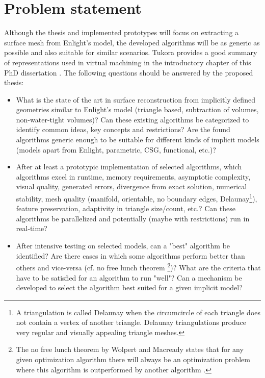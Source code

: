 
\section{Problem statement}

Although the thesis and implemented prototypes will focus on extracting a surface mesh from Enlight's model, the developed algorithms will be as generic as possible and also suitable for similar scenarios. Tukora provides a good summary of representations used in virtual machining in the introductory chapter of this PhD dissertation \cite{virtual_machining_review}.
The following questions should be answered by the proposed thesis:

\begin{itemize}
	\item What is the state of the art in surface reconstruction from implicitly defined geometries similar to Enlight's model (triangle based, subtraction of volumes, non-water-tight volumes)? Can these existing algorithms be categorized to identify common ideas, key concepts and restrictions? Are the found algorithms generic enough to be suitable for different kinds of implicit models (models apart from Enlight, parametric, CSG, functional, etc.)?
	
	\item After at least a prototypic implementation of selected algorithms, which algorithms excel in runtime, memory requirements, asymptotic complexity, visual quality, generated errors, divergence from exact solution, numerical stability, mesh quality (manifold, orientable, no boundary edges, Delaunay\footnote{A triangulation is called Delaunay when the circumcircle of each triangle does not contain a vertex of another triangle. Delaunay triangulations produce very regular and visually appealing triangle meshes.}), feature preservation, adaptivity in triangle size/count, etc.? Can these algorithms be parallelized and potentially (maybe with restrictions) run in real-time?
	
	\item After intensive testing on selected models, can a "best" algorithm be identified? Are there cases in which some algorithms perform better than others and vice-versa (cf. no free lunch theorem \footnote{The no free lunch theorem by Wolpert and Macready states that for any given optimization algorithm there will always be an optimization problem where this algorithm is outperformed by another algorithm \cite{no_free_lunch}. })? What are the criteria that have to be satisfied for an algorithm to run "well"? Can a mechanism be developed to select the algorithm best suited for a given implicit model?
\end{itemize}

